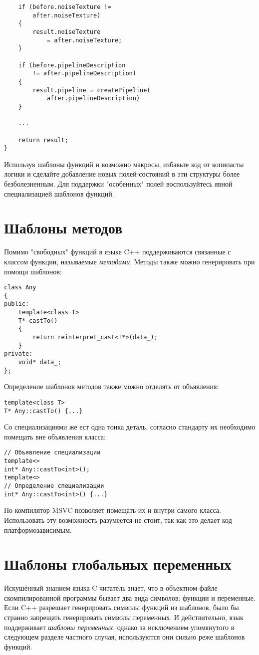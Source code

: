 \begin{itemize}
\begin{verbatim}
    if (before.noiseTexture !=
        after.noiseTexture)
    {
        result.noiseTexture
            = after.noiseTexture;
    }

    if (before.pipelineDescription
        != after.pipelineDescription)
    {
        result.pipeline = createPipeline(
            after.pipelineDescription)
    }

    ...

    return result;
}
\end{verbatim}
Используя шаблоны функций и возможно макросы, избавьте код от копипасты логики и сделайте добавление новых полей-состояний в эти структуры более безболезненным. Для поддержки "особенных" полей воспользуйтесь явной специализацией шаблонов функций. 
\end{itemize}

\section{Шаблоны методов}

Помимо "свободных" функций в языке C++ поддерживаются связанные с классом функции, называемые \textit{методами}. Методы также можно генерировать при помощи шаблонов:
\begin{verbatim}
class Any
{
public:
    template<class T>
    T* castTo()
    {
        return reinterpret_cast<T*>(data_);
    }
private:
    void* data_;
};
\end{verbatim}
Определение шаблонов методов также можно отделять от объявления:
\begin{verbatim}
template<class T>
T* Any::castTo() {...}
\end{verbatim}
Со специализациями же ест одна тонка деталь, согласно стандарту их необходимо помещать вне объявления класса:
\begin{verbatim}
// Объявление специализации
template<>
int* Any::castTo<int>();
template<>
// Определение специализации
int* Any::castTo<int>() {...}
\end{verbatim}
Но компилятор MSVC позволяет помещать их и внутри самого класса. Использовать эту возможность разумеется не стоит, так как это делает код платформозависимым.

\section{Шаблоны глобальных переменных}

Искушённый знанием языка C читатель знает, что в объектном файле скомпилированной программы бывает два вида символов: функции и переменные. Если C++ разрешает генерировать символы функций из шаблонов, было бы странно запрещать генерировать символы переменных. И действительно, язык поддерживает \textit{шаблоны переменных}, однако за исключением упомянутого в следующем разделе частного случая, используются они сильно реже шаблонов функций.

